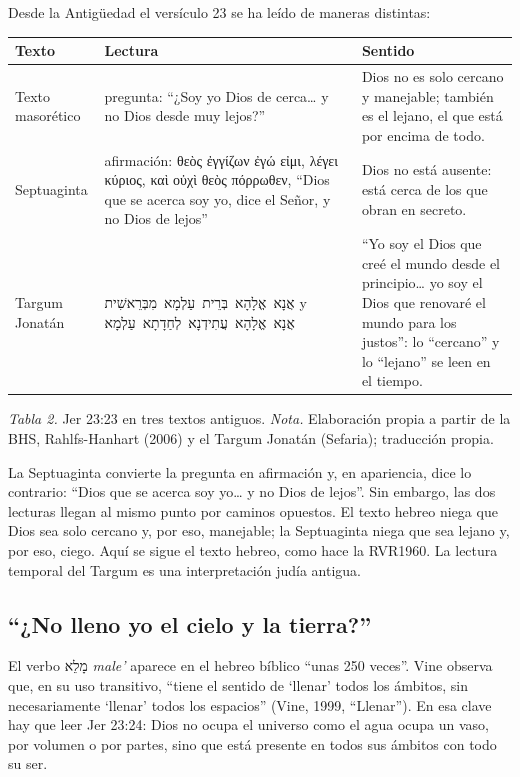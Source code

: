 \documentclass[11pt,letterpaper]{article}
\newcommand{\heb}[1]{\mbox{\foreignlanguage{hebrew}{#1}}}
\newcommand{\grc}[1]{\foreignlanguage{ancientgreek}{#1}}
\begin{document}
Desde la Antigüedad el versículo 23 se ha leído de maneras distintas:

\begin{center}\small\renewcommand{\arraystretch}{1.22}
\begin{tabular}{@{}L{2.6cm}L{5.6cm}L{6.0cm}@{}}
\toprule
\textbf{Texto} & \textbf{Lectura} & \textbf{Sentido} \\ \midrule
Texto masorético & pregunta: ``¿Soy yo Dios de cerca\ldots{} y no Dios desde muy lejos?'' & Dios no es solo cercano y manejable; también es el lejano, el que está por encima de todo. \\
Septuaginta & afirmación: \grc{θεὸς ἐγγίζων ἐγώ εἰμι, λέγει κύριος, καὶ οὐχὶ θεὸς πόρρωθεν}, ``Dios que se acerca soy yo, dice el Señor, y no Dios de lejos'' & Dios no está ausente: está cerca de los que obran en secreto. \\
Targum Jonatán & \heb{אֲנָא אֱלָהָא בְּרֵית עַלְמָא מִבְּרֵאשִׁית} y \heb{אֲנָא אֱלָהָא עֲתִידְנָא לְחַדָתָא עַלְמָא} & ``Yo soy el Dios que creé el mundo desde el principio\ldots{} yo soy el Dios que renovaré el mundo para los justos'': lo ``cercano'' y lo ``lejano'' se leen en el tiempo. \\
\bottomrule
\end{tabular}\par
{\footnotesize\color{gris}\textit{Tabla 2.} Jer 23:23 en tres textos antiguos. \textit{Nota.} Elaboración propia a partir de la BHS, Rahlfs-Hanhart (2006) y el Targum Jonatán (Sefaria); traducción propia.}
\end{center}

\begin{nota}
La Septuaginta convierte la pregunta en afirmación y, en apariencia, dice lo contrario: ``Dios que se acerca soy yo\ldots{} y no Dios de lejos''. Sin embargo, las dos lecturas llegan al mismo punto por caminos opuestos. El texto hebreo niega que Dios sea solo cercano y, por eso, manejable; la Septuaginta niega que sea lejano y, por eso, ciego. Aquí se sigue el texto hebreo, como hace la RVR1960. La lectura temporal del Targum es una interpretación judía antigua.
\end{nota}

\subsection{``¿No lleno yo el cielo y la tierra?''}

El verbo \heb{מָלֵא} \emph{male'} aparece en el hebreo bíblico ``unas 250 veces''. Vine observa que, en su uso transitivo, ``tiene el sentido de `llenar' todos los ámbitos, sin necesariamente `llenar' todos los espacios'' (Vine, 1999, ``Llenar''). En esa clave hay que leer Jer 23:24: Dios no ocupa el universo como el agua ocupa un vaso, por volumen o por partes, sino que está presente en todos sus ámbitos con todo su ser.
\end{document}
